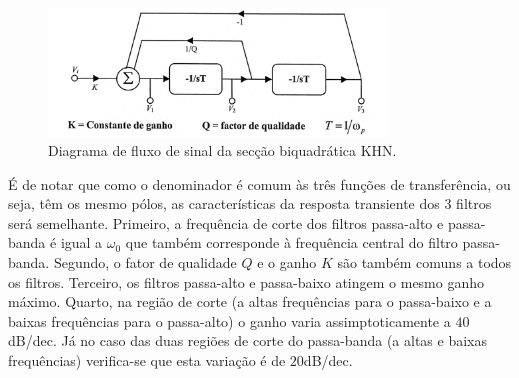 \begin{figure}
    \centering
    \includegraphics[width = 0.8\textwidth]{Imagens/dfs.png}
    \caption{Diagrama de fluxo de sinal da secção biquadrática KHN.}
    \label{fig:dfs_KHN}
\end{figure}

É de notar que como o denominador é comum às três funções de transferência, ou seja, têm os mesmo pólos, as características da resposta transiente dos 3 filtros será semelhante. Primeiro, a frequência de corte dos filtros passa-alto e passa-banda é igual a $\omega_0$ que também corresponde à frequência central do filtro passa-banda. Segundo, o fator de qualidade $Q$ e o ganho $K$ são também comuns a todos os filtros. Terceiro, os filtros passa-alto e passa-baixo atingem o mesmo ganho máximo. Quarto, na região de corte (a altas frequências para o passa-baixo e a baixas frequências para o passa-alto) o ganho varia assimptoticamente a $40$dB/dec. Já no caso das duas regiões de corte do passa-banda (a altas e baixas frequências) verifica-se que esta variação é de $20$dB/dec.

